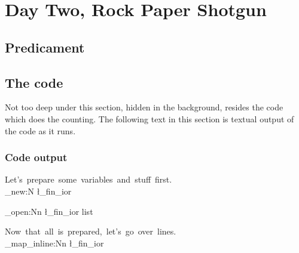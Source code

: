 \documentclass[]{article}
\begin{document}
    
  \section{Day Two, Rock Paper Shotgun}

    \subsection{Predicament}

    \subsection{The code}

      Not too deep under this section, hidden in the background, resides the code which does the counting. The following text in this section is textual output of the code as it runs.

      \subsubsection{Code output}

        \ExplSyntaxOn

        Let's~prepare~some~variables~and~stuff~first.\newline\\

          \ior_new:N \l_fin_ior

          \ior_open:Nn \l_fin_ior {list}



        Now~that~all~is~prepared,~let's~go~over~lines.\newline\\

          \ior_map_inline:Nn \l_fin_ior {}

        \ExplSyntaxOff
\end{document}
